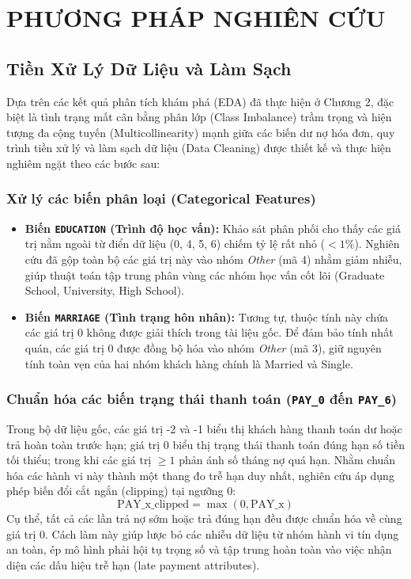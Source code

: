 \chapter{PHƯƠNG PHÁP NGHIÊN CỨU}

\section{Tiền Xử Lý Dữ Liệu và Làm Sạch}

Dựa trên các kết quả phân tích khám phá (EDA) đã thực hiện ở Chương 2, đặc biệt là tình trạng mất cân bằng phân lớp (Class Imbalance) trầm trọng và hiện tượng đa cộng tuyến (Multicollinearity) mạnh giữa các biến dư nợ hóa đơn, quy trình tiền xử lý và làm sạch dữ liệu (Data Cleaning) được thiết kế và thực hiện nghiêm ngặt theo các bước sau:

\subsection{Xử lý các biến phân loại (Categorical Features)}
\begin{itemize}
    \item \textbf{Biến \texttt{EDUCATION} (Trình độ học vấn):} Khảo sát phân phối cho thấy các giá trị nằm ngoài từ điển dữ liệu (0, 4, 5, 6) chiếm tỷ lệ rất nhỏ ($< 1\%$). Nghiên cứu đã gộp toàn bộ các giá trị này vào nhóm \textit{Other} (mã 4) nhằm giảm nhiễu, giúp thuật toán tập trung phân vùng các nhóm học vấn cốt lõi (Graduate School, University, High School).
    \item \textbf{Biến \texttt{MARRIAGE} (Tình trạng hôn nhân):} Tương tự, thuộc tính này chứa các giá trị 0 không được giải thích trong tài liệu gốc. Để đảm bảo tính nhất quán, các giá trị 0 được đồng bộ hóa vào nhóm \textit{Other} (mã 3), giữ nguyên tính toàn vẹn của hai nhóm khách hàng chính là Married và Single.
\end{itemize}

\subsection{Chuẩn hóa các biến trạng thái thanh toán (\texttt{PAY\_0} đến \texttt{PAY\_6})}
Trong bộ dữ liệu gốc, các giá trị -2 và -1 biểu thị khách hàng thanh toán dư hoặc trả hoàn toàn trước hạn; giá trị 0 biểu thị trạng thái thanh toán đúng hạn số tiền tối thiểu; trong khi các giá trị $\ge 1$ phản ánh số tháng nợ quá hạn. Nhằm chuẩn hóa các hành vi này thành một thang đo trễ hạn duy nhất, nghiên cứu áp dụng phép biến đổi cắt ngắn (clipping) tại ngưỡng 0:
\begin{equation}
    \text{PAY\_x\_clipped} = \max(0, \text{PAY\_x})
\end{equation}
Cụ thể, tất cả các lần trả nợ sớm hoặc trả đúng hạn đều được chuẩn hóa về cùng giá trị 0. Cách làm này giúp lược bỏ các nhiễu dữ liệu từ nhóm hành vi tín dụng an toàn, ép mô hình phải hội tụ trọng số và tập trung hoàn toàn vào việc nhận diện các dấu hiệu trễ hạn (late payment attributes).
